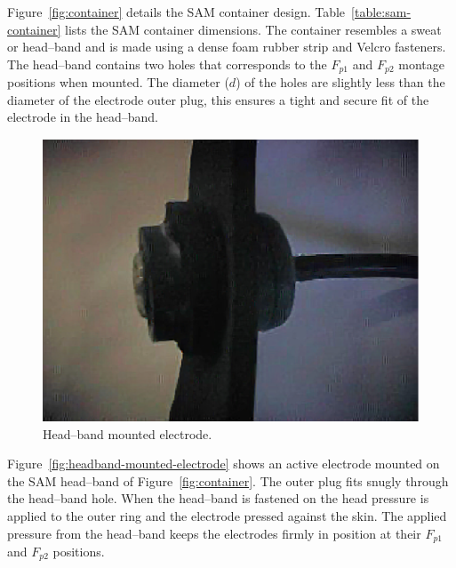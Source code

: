 Figure~\vref{fig:container} details the SAM container
design. Table~\ref{table:sam-container} lists the SAM container
dimensions. The container resembles a sweat or head--band and is made
using a dense foam rubber strip and Velcro fasteners. The head--band
contains two holes that corresponds to the $F_{p1}$ and $F_{p2}$
montage positions when mounted. The diameter ($d$) of the holes are
slightly less than the diameter of the electrode outer plug, this
ensures a tight and secure fit of the electrode in the head--band.

\begin{center}
\begin{figure}[htbp]
	\begin{center}
	\includegraphics{single-electrode-headband.ps}
	\caption{Head--band mounted electrode.}
	\label{fig:headband-mounted-electrode}
	\end{center}
\end{figure}
\end{center}

Figure~\vref{fig:headband-mounted-electrode} shows an active electrode
mounted on the SAM head--band of Figure~\vref{fig:container}. The
outer plug fits snugly through the head--band hole.  When the
head--band is fastened on the head pressure is applied to the outer
ring and the electrode pressed against the skin. The applied pressure
from the head--band keeps the electrodes firmly in position at their
$F_{p1}$ and $F_{p2}$ positions.


